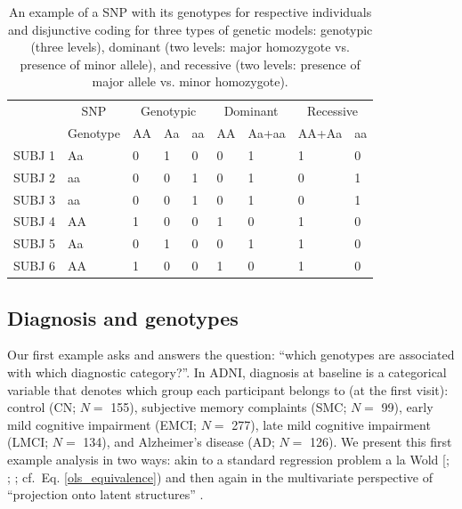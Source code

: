 \documentclass[12pt]{article}
\begin{document}
\begin{table}[!h]

\caption{\label{tab:unnamed-chunk-2}\label{table:snps_models_disj} An example of a SNP with its genotypes for respective individuals and disjunctive coding for three types of genetic models: genotypic (three levels), dominant (two levels: major homozygote vs. presence of minor allele), and recessive (two levels: presence of major allele vs. minor homozygote).}
\centering
\begin{tabular}[t]{lllllllll}
\toprule
\multicolumn{1}{c}{ } & \multicolumn{1}{c}{SNP} & \multicolumn{3}{c}{Genotypic} & \multicolumn{2}{c}{Dominant} & \multicolumn{2}{c}{Recessive} \\
\cmidrule(l{2pt}r{2pt}){2-2} \cmidrule(l{2pt}r{2pt}){3-5} \cmidrule(l{2pt}r{2pt}){6-7} \cmidrule(l{2pt}r{2pt}){8-9}
  & Genotype & AA & Aa & aa & AA & Aa+aa & AA+Aa & aa\\
\midrule
SUBJ 1 & Aa & 0 & 1 & 0 & 0 & 1 & 1 & 0\\
SUBJ 2 & aa & 0 & 0 & 1 & 0 & 1 & 0 & 1\\
SUBJ 3 & aa & 0 & 0 & 1 & 0 & 1 & 0 & 1\\
SUBJ 4 & AA & 1 & 0 & 0 & 1 & 0 & 1 & 0\\
SUBJ 5 & Aa & 0 & 1 & 0 & 0 & 1 & 1 & 0\\
\addlinespace
SUBJ 6 & AA & 1 & 0 & 0 & 1 & 0 & 1 & 0\\
\bottomrule
\end{tabular}
\end{table}

\hypertarget{diagnosis-and-genotypes}{%
\subsection{Diagnosis and genotypes}\label{diagnosis-and-genotypes}}

\label{section:plscarda}

Our first example asks and answers the question: ``which genotypes are
associated with which diagnostic category?''. In ADNI, diagnosis at
baseline is a categorical variable that denotes which group each
participant belongs to (at the first visit): control (CN; \(N=\) 155),
subjective memory complaints (SMC; \(N=\) 99), early mild cognitive
impairment (EMCI; \(N=\) 277), late mild cognitive impairment (LMCI;
\(N=\) 134), and Alzheimer's disease (AD; \(N=\) 126). We present this
first example analysis in two ways: akin to a standard regression
problem a la Wold {[}\citet{wold_soft_1975};
\citet{wold_collinearity_1984}; \citet{wold_principal_1987}; cf.~Eq.
\ref{ols_equivalence}) and then again in the multivariate perspective of
``projection onto latent structures'' \citep{abdi_partial_2010-1}.
\end{document}
